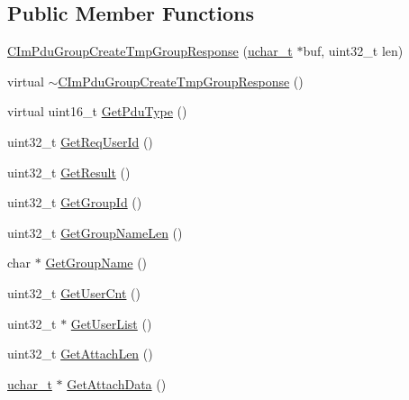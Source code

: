 \subsection*{Public Member Functions}
\begin{DoxyCompactItemize}
\item 
\hyperlink{class_c_im_pdu_group_create_tmp_group_response_afcfa7efdfbac20e555b8a6bf145dcd3a}{C\+Im\+Pdu\+Group\+Create\+Tmp\+Group\+Response} (\hyperlink{base_2ostype_8h_a124ea0f8f4a23a0a286b5582137f0b8d}{uchar\+\_\+t} $\ast$buf, uint32\+\_\+t len)
\item 
virtual \hyperlink{class_c_im_pdu_group_create_tmp_group_response_a818bb1679ca84cc8bbb54d8e1c3f6d6e}{$\sim$\+C\+Im\+Pdu\+Group\+Create\+Tmp\+Group\+Response} ()
\item 
virtual uint16\+\_\+t \hyperlink{class_c_im_pdu_group_create_tmp_group_response_a2d3a0122ef849252675418d240f764e0}{Get\+Pdu\+Type} ()
\item 
uint32\+\_\+t \hyperlink{class_c_im_pdu_group_create_tmp_group_response_a3514e86da6e3ba26fa29dac9c5c90e9e}{Get\+Req\+User\+Id} ()
\item 
uint32\+\_\+t \hyperlink{class_c_im_pdu_group_create_tmp_group_response_a1cf78730d39d671272bd428cb9c0e798}{Get\+Result} ()
\item 
uint32\+\_\+t \hyperlink{class_c_im_pdu_group_create_tmp_group_response_aa5d0e8588b322cf11276a7d9cc1c4e8b}{Get\+Group\+Id} ()
\item 
uint32\+\_\+t \hyperlink{class_c_im_pdu_group_create_tmp_group_response_a23b9b47ac8548b6360e213b7c90eecca}{Get\+Group\+Name\+Len} ()
\item 
char $\ast$ \hyperlink{class_c_im_pdu_group_create_tmp_group_response_a835ed82887be891487089007ba954562}{Get\+Group\+Name} ()
\item 
uint32\+\_\+t \hyperlink{class_c_im_pdu_group_create_tmp_group_response_aab9ada8401508ba20957c860d3da6b06}{Get\+User\+Cnt} ()
\item 
uint32\+\_\+t $\ast$ \hyperlink{class_c_im_pdu_group_create_tmp_group_response_a7b50f95f201b04b358bce524bc1363a9}{Get\+User\+List} ()
\item 
uint32\+\_\+t \hyperlink{class_c_im_pdu_group_create_tmp_group_response_aa4c540ecff9a9b3547039c6c94830637}{Get\+Attach\+Len} ()
\item 
\hyperlink{base_2ostype_8h_a124ea0f8f4a23a0a286b5582137f0b8d}{uchar\+\_\+t} $\ast$ \hyperlink{class_c_im_pdu_group_create_tmp_group_response_a74794c734e29ae38f14d179780eff262}{Get\+Attach\+Data} ()
\end{DoxyCompactItemize}
